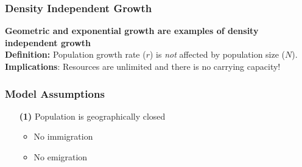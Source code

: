 \documentclass[color=usenames,dvipsnames]{beamer}\usepackage[]{graphicx}\usepackage[]{color}
\begin{document}
\begin{frame}
  \frametitle{Density Independent Growth}
  \large
  \textbf{Geometric and exponential growth are examples of \alert{\bf
      density independent} growth} \\
  \vspace{0.5cm}
  \pause
  \textbf{Definition:} Population growth rate ($r$) is \textit{not} affected by
    population size ($N$). \\
  \pause
  \vspace{0.5cm}
  \textbf{Implications}:  Resources are unlimited and there is no carrying capacity!
\end{frame}








\begin{frame}
  \frametitle{Model Assumptions}
  \large
  \begin{itemize}
  \item[{\color{beamer@blendedblue} \bf (1)}] {Population is geographically closed}
    \begin{itemize}
      \large
      \item No immigration
      \item No emigration
    \end{itemize}
  \end{itemize}
\end{frame}
\end{document}
